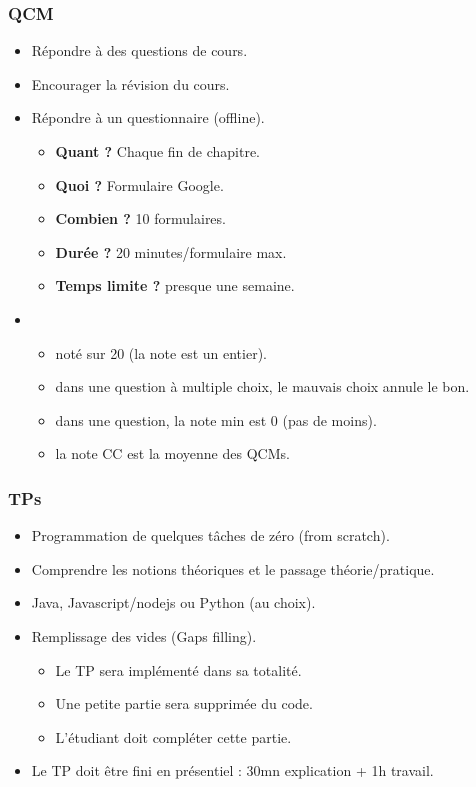 \documentclass{beamer}
\begin{document}
\begin{frame}
	\frametitle{QCM}
	
	\begin{itemize}
		\item Répondre à des questions de cours.
		\item {} Encourager la révision du cours.
		\item {} Répondre à un questionnaire (offline).
		\begin{itemize}
			\item \textbf{Quant ?} Chaque fin de chapitre.
			\item \textbf{Quoi ?} Formulaire Google.
			\item \textbf{Combien ?} 10 formulaires.
			\item \textbf{Durée ?} 20 minutes/formulaire max.
			\item \textbf{Temps limite ?} presque une semaine.
		\end{itemize}
		\item {}
		\begin{itemize}
			\item noté sur 20 (la note est un entier).
			\item dans une question à multiple choix, le mauvais choix annule le bon.
			\item dans une question, la note min est 0 (pas de moins).
			\item la note CC est la moyenne des QCMs.
		\end{itemize}
	\end{itemize}
	
\end{frame}

\begin{frame}
	\frametitle{TPs}
	
	\begin{itemize}
		\item Programmation de quelques tâches de zéro (from scratch).
		\item {} Comprendre les notions théoriques et le passage théorie/pratique.
		\item {} Java, Javascript/nodejs ou Python (au choix).
		\item {} Remplissage des vides (Gaps filling).
		\begin{itemize}
			\item Le TP sera implémenté dans sa totalité.
			\item Une petite partie sera supprimée du code.
			\item L'étudiant doit compléter cette partie.
		\end{itemize}
		\item Le TP doit être fini en présentiel : 30mn explication +  1h travail.
	\end{itemize}
	
\end{frame}
\end{document}
